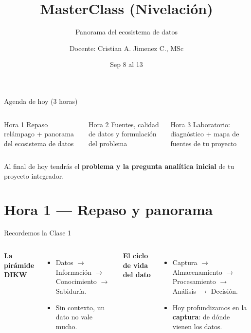 \documentclass[aspectratio=169,11pt]{beamer}
\title{MasterClass (Nivelación)}
\subtitle{Panorama del ecosistema de datos}
\author{Docente: Cristian A. Jimenez C., MSc}
\date{Sep 8 al 13}
\begin{document}
{
\begin{frame}[plain]
  \titlepage
\end{frame}
}

\begin{frame}{Agenda de hoy (3 horas)}
  \begin{columns}[T,onlytextwidth]
    \begin{block}{Hora 1}
      \small Repaso relámpago + panorama del ecosistema de datos
    \end{block}
    \begin{block}{Hora 2}
      \small Fuentes, calidad de datos y formulación del problema
    \end{block}
    \begin{block}{Hora 3}
      \small Laboratorio: diagnóstico + mapa de fuentes de tu proyecto
    \end{block}
  \end{columns}
  \vspace{0.5cm}
  \small Al final de hoy tendrás el \textbf{problema y la pregunta
  analítica inicial} de tu proyecto integrador.
\end{frame}

\section{Hora 1 — Repaso y panorama}
\begin{frame}{Recordemos la Clase 1}
  \begin{columns}[T,onlytextwidth]
    \textbf{La pirámide DIKW}
    \begin{itemize}
      \small
      \item Datos $\to$ Información $\to$ Conocimiento $\to$ Sabiduría.
      \item Sin contexto, un dato no vale mucho.
    \end{itemize}
    \textbf{El ciclo de vida del dato}
    \begin{itemize}
      \small
      \item Captura $\to$ Almacenamiento $\to$ Procesamiento $\to$ Análisis $\to$ Decisión.
      \item Hoy profundizamos en la \textbf{captura}: de dónde vienen los datos.
    \end{itemize}
  \end{columns}
\end{frame}
\end{document}
